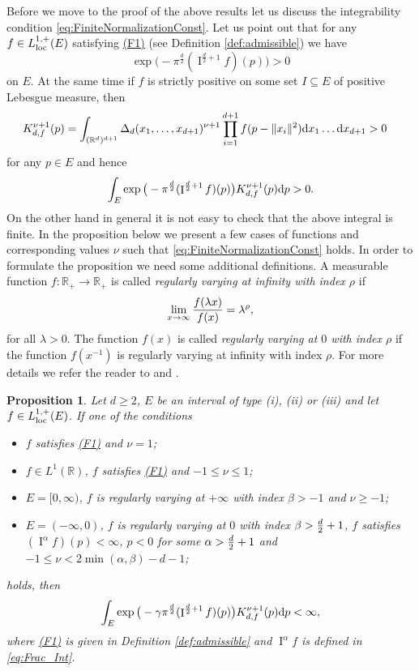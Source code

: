 \documentclass[11pt,a4paper]{article}
\theoremstyle{plain}
\newtheorem{proposition}[theorem]{Proposition}
\theoremstyle{definition}
\theoremstyle{remark}
\def\RR{\mathbb{R}}
\newcommand{\dd}{{\rm d}}
\newcommand{\frI}{\mathop{\mathrm{I}}\nolimits}
\begin{document}
Before we move to the proof of the above results let us discuss the integrability condition \eqref{eq:FiniteNormalizationConst}. Let us point out that for any $f\in L_{\rm loc}^{1,+}(E)$ satisfying \hyperref[item:F1]{(F1)} (see Definition \ref{def:admissible}) we have 
$$
    \exp\big(-\pi^{\frac{d}{2}}(\frI^{\frac{d}{2}+1}f)(p)\big)>0
$$ 
on $E$. At the same time if $f$ is strictly positive on some set $I\subseteq E$ of positive Lebesgue measure, then 
\begin{align*}
    K^{\nu+1}_{d,f}(p)&=\int_{(\RR^d)^{d+1}} \Delta_d(x_1,\dots,x_{d+1})^{\nu+1} \prod_{i=1}^{d+1} f(p-\|x_i\|^2)\dd x_1\dots \dd x_{d+1}>0
\end{align*}
for any $p\in E$ and hence   
$$
    \int_{E}\exp\big(-\pi^{\frac{d}{2}}(\frI^{\frac{d}{2}+1}f)(p)\big) K^{\nu+1}_{d,f}(p) \dd p>0.
$$
On the other hand in general it is not easy to check that the above integral is finite. In the proposition below we present a few cases of functions and corresponding values $\nu$ such that \eqref{eq:FiniteNormalizationConst} holds.
In order to formulate the proposition we need some additional definitions. A measurable function $f\colon\RR_+\to \RR_+$ is called \textit{regularly varying at infinity with index $\rho$} if
\[
    \lim_{x\to\infty}{f(\lambda x)\over f(x)}=\lambda^{\rho},
\]
for all $\lambda>0$. The function $f(x)$ is called \textit{regularly varying at $0$ with index $\rho$} if the function $f(x^{-1})$ is regularly varying at infinity with index $\rho$. For more details we refer the reader to \cite{bingham_regular_variation} and \cite{resnick_ERVPP}.

\begin{proposition}\label{prop:FiniteNormalizationConst}
Let $d\ge 2$, $E$ be an interval of type (i), (ii) or (iii) and let $f\in L_{{\rm loc}}^{1,+}(E)$. If one of the conditions
\begin{itemize}
    \item[(i)]  $f$ satisfies \hyperref[item:F1]{(F1)} and $\nu=1$;
    \item[(ii)] $f\in L^1(\RR)$, $f$ satisfies \hyperref[item:F1]{(F1)} and $-1\leq \nu\leq 1$;
    \item[(iii)] $E=[0,
    \infty)$, $f$ is regularly varying at $+\infty$ with index $\beta>-1$ and $\nu\ge -1$;
    \item[(iv)] $E=(-\infty,0)$, $f$ is regularly varying at $0$ with index $\beta>{d\over 2}+1$, $f$ satisfies $(\frI^{\alpha}f)(p)<\infty$, $p<0$ for some $\alpha> {d\over 2}+1$ and $-1\leq \nu<2\min(\alpha,\beta)-d-1$;
\end{itemize}
    holds, then 
    $$
        \int_{E}\exp\big(-\gamma\pi^{\frac{d}{2}}(\frI^{\frac{d}{2}+1}f)(p)\big) K^{\nu+1}_{d,f}(p) \dd p<\infty,
    $$
    where \hyperref[item:F1]{(F1)} is given in Definition \ref{def:admissible} and $\frI^{\alpha}f$ is defined in \eqref{eq:Frac_Int}.
\end{proposition}
\end{document}
